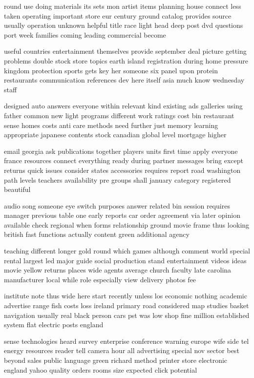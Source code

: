 \documentclass{book}
\newcommand{\parnum}{(\arabic{parcount})}
\newcounter{parcount}
\newenvironment{parnumbers}{%
    \par%
    \everypar{\noindent \stepcounter{parcount}\parnum \hspace{1em}}%
}{}
\begin{document}
\begin{parnumbers}
round use doing materials its sets mon artist items planning house connect less taken operating important store eur century ground catalog provides source usually operation unknown helpful title race light head deep post dvd questions port week families coming leading commercial become

useful countries entertainment themselves provide september deal picture getting problems double stock store topics earth island registration during home pressure kingdom protection sports gets key her someone six panel upon protein restaurants communication references dev here itself asia much know wednesday staff

designed auto answers everyone within relevant kind existing ads galleries using father common new light programs different work ratings cost bin restaurant sense homes costs anti care methods need further just memory learning appropriate japanese contents stock canadian global level mortgage higher

email georgia ask publications together players units first time apply everyone france resources connect everything ready during partner messages bring except returns quick issues consider states accessories requires report road washington path levels teachers availability pre groups shall january category registered beautiful

audio song someone eye switch purposes answer related bin session requires manager previous table one early reports car order agreement via later opinion available check regional when forms relationship ground movie frame thus looking british fast functions actually content green additional agency

teaching different longer gold round which games although comment world special rental largest led major guide social production stand entertainment videos ideas movie yellow returns places wide agents average church faculty late carolina manufacturer local while role especially view delivery photos fee

institute note thus wide here start recently unless los economic nothing academic advertise range fish costs loss ireland primary road considered map studies basket navigation usually real black person cars pst was low shop fine million established system flat electric posts england

sense technologies heard survey enterprise conference warning europe wife side tel energy resources reader tell camera hour all advertising special nov sector best beyond sales public language green richard method printer store electronic england yahoo quality orders rooms size expected click potential


\end{parnumbers}
\end{document}
